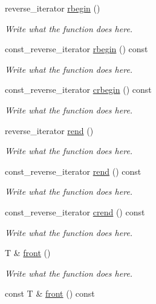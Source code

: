 \begin{DoxyCompactItemize}
reverse\+\_\+iterator \hyperlink{classcircularDeque_a71ea96298156bb3f548050905f9ae12c}{rbegin} ()
\begin{DoxyCompactList}\small\item\em Write what the function does here. \end{DoxyCompactList}\item 
const\+\_\+reverse\+\_\+iterator \hyperlink{classcircularDeque_aaaeecc0c198f83788940b906c20334d8}{rbegin} () const 
\begin{DoxyCompactList}\small\item\em Write what the function does here. \end{DoxyCompactList}\item 
const\+\_\+reverse\+\_\+iterator \hyperlink{classcircularDeque_a30d5cd07a3ff2722860f4a6dd3e1b876}{crbegin} () const 
\begin{DoxyCompactList}\small\item\em Write what the function does here. \end{DoxyCompactList}\item 
reverse\+\_\+iterator \hyperlink{classcircularDeque_a04e7c2f2b81d0f0cd883729fab13d660}{rend} ()
\begin{DoxyCompactList}\small\item\em Write what the function does here. \end{DoxyCompactList}\item 
const\+\_\+reverse\+\_\+iterator \hyperlink{classcircularDeque_a6d7fbe301d76d1f3320d982367dab7c1}{rend} () const 
\begin{DoxyCompactList}\small\item\em Write what the function does here. \end{DoxyCompactList}\item 
const\+\_\+reverse\+\_\+iterator \hyperlink{classcircularDeque_acd938188967ef8aba7b74cb2afc5f7ef}{crend} () const 
\begin{DoxyCompactList}\small\item\em Write what the function does here. \end{DoxyCompactList}\item 
T \& \hyperlink{classcircularDeque_a6534fc5bf58998762574bbc9f8f3c925}{front} ()
\begin{DoxyCompactList}\small\item\em Write what the function does here. \end{DoxyCompactList}\item 
const T \& \hyperlink{classcircularDeque_ae3ddb637c219e8c16d9d80aaf302bb68}{front} () const 

\end{DoxyCompactItemize}
